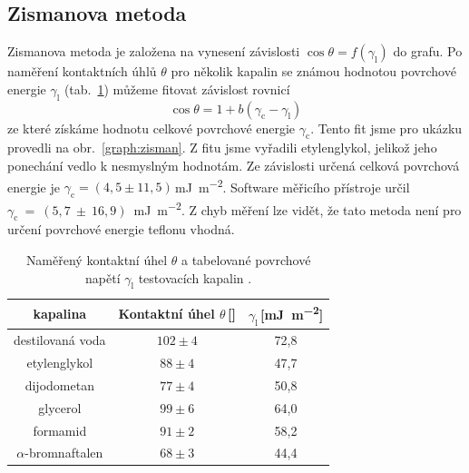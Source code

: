 \documentclass{protokol}
\begin{document}
\subsection{Zismanova metoda}
\par Zismanova metoda je založena na vynesení závislosti $\cos\theta = 
f\left(\gamma_{\text{l}} \right)$ do grafu. Po naměření kontaktních úhlů 
$\theta$ pro několik kapalin se známou hodnotou povrchové energie 
$\gamma_{\text{l}}$ (tab.~\ref{table:surfTensionLiquid}) můžeme fitovat 
závislost rovnicí
\begin{equation}
	\cos\theta = 1 + 
	b \left( \gamma_{\text{c}} - \gamma_{\text{l}} \right)
\end{equation}
ze které získáme hodnotu celkové povrchové energie $\gamma_{\text{c}}$. Tento 
fit jsme pro ukázku provedli na obr.~\ref{graph:zisman}. Z fitu jsme vyřadili 
etylenglykol, jelikož jeho ponechání vedlo k nesmyslným hodnotám. Ze závislosti 
určená celková povrchová energie je $\gamma_{\text{c}} = 
(4,5\pm11,5)$\,\si{\milli\joule\per\meter\squared}. Software měřicího přístroje určil 
$\gamma_{\text{c}}~=~(5,7~\pm~16,9)$~\si{\milli\joule\per\meter\squared}. Z chyb měření lze vidět, že 
tato 
metoda není pro určení povrchové energie teflonu vhodná.

\begin{table}[h]
	\caption{Naměřený kontaktní úhel $\theta$ a tabelované povrchové napětí 
		$\gamma_{\text{l}}$ testovacích kapalin \cite{napetiKapalin}.}
	\label{table:surfTensionLiquid}
	\begin{tabular}{|c|c|c|}\hline
		kapalina  & Kontaktní úhel $\theta$\,[\si{\deg}] &
		$\gamma_{\text{l}}$\,[\si{\milli\joule\per\meter\squared}]\\ \hline
		destilovaná voda & $102\pm4$ & 72,8                              \\
		etylenglykol     & $88\pm4$ & 47,7                              \\
		dijodometan      & $77\pm4$ & 50,8                              \\
		glycerol         & $99\pm6$ & 64,0                              \\
		formamid         & $91\pm2$ & 58,2                              \\
		$\alpha$-bromnaftalen &$68\pm3$ & 44,4  \\ \hline
	\end{tabular}
\end{table}

\end{document}
